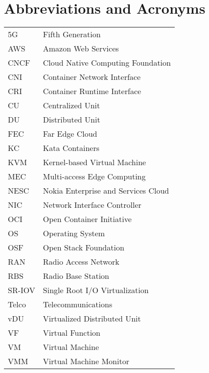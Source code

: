 \chapter*{Abbreviations and Acronyms}

\noindent
\begin{longtable}{@{}p{}p{}@{}}
5G & Fifth Generation \\
AWS & Amazon Web Services \\
CNCF & Cloud Native Computing Foundation \\
CNI & Container Network Interface \\
CRI & Container Runtime Interface \\
CU & Centralized Unit \\
DU & Distributed Unit \\
FEC & Far Edge Cloud \\
KC & Kata Containers \\
KVM & Kernel-based Virtual Machine \\
MEC & Multi-access Edge Computing \\
NESC & Nokia Enterprise and Services Cloud \\
NIC & Network Interface Controller \\
OCI & Open Container Initiative \\
OS & Operating System \\
OSF & Open Stack Foundation \\
RAN & Radio Access Network \\
RBS & Radio Base Station \\
SR-IOV & Single Root I/O Virtualization \\
Telco & Telecommunications \\
vDU & Virtualized Distributed Unit \\
VF & Virtual Function \\
VM & Virtual Machine \\
VMM & Virtual Machine Monitor \\



\end{longtable}
